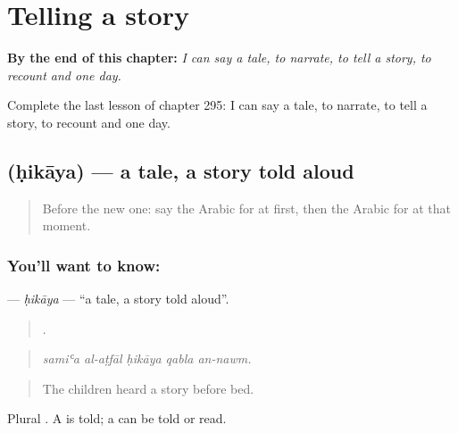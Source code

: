 
\chapter{Telling a story}
\label{ch:ar-telling-a-story}

\begin{chapteropening}
\textbf{By the end of this chapter:} \emph{I can say a tale, to narrate, to tell a story, to recount and one day.}

Complete the last lesson of chapter 295: I can say a tale, to narrate, to tell a story, to recount and one day.
\end{chapteropening}

\section[\texorpdfstring{\ar{حكاية} (ḥikāya)}{حكاية (ḥikāya)}]{ (ḥikāya) — a tale, a story told aloud}

\label{lesson:AR-C295-hikaya}



\begin{quote}
Before the new one: say the Arabic for at first, then the Arabic for at that moment.
\end{quote}

\subsection*{You'll want to know: }
\textbf{} — \emph{ḥikāya} — \textquotedblleft{}a tale, a story told aloud\textquotedblright{}.

\begin{quote}
    .
\end{quote}

\begin{quote}
\emph{samiʿa al-aṭfāl ḥikāya qabla an-nawm.}
\end{quote}

\begin{quote}
The children heard a story before bed.
\end{quote}

Plural . A  is told; a  can be told or read.

